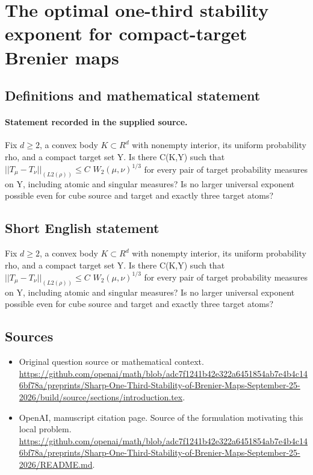 \documentclass[11pt]{article}
\begin{document}
\section*{The optimal one-third stability exponent for compact-target Brenier maps}\label{statement}
\subsection{Definitions and mathematical statement}
\paragraph{Statement recorded in the supplied source.}
Fix $d\geq 2$, a convex body $K\subset R^d$ with nonempty interior, its uniform probability rho, and a compact target set Y. Is there C(K,Y) such that $||T_\mu -T_\nu ||_(L2(\rho ))\leq C$ $W_2(\mu ,\nu )^{1/3}$ for every pair of target probability measures on Y, including atomic and singular measures? Is no larger universal exponent possible even for cube source and target and exactly three target atoms?
\subsection{Short English statement}
Fix $d\geq 2$, a convex body $K\subset R^d$ with nonempty interior, its uniform probability rho, and a compact target set Y. Is there C(K,Y) such that $||T_\mu -T_\nu ||_(L2(\rho ))\leq C$ $W_2(\mu ,\nu )^{1/3}$ for every pair of target probability measures on Y, including atomic and singular measures? Is no larger universal exponent possible even for cube source and target and exactly three target atoms?
\subsection{Sources}
\begin{itemize}
\item[S1] Original question source or mathematical context.
\url{https://github.com/openai/math/blob/adc7f1241b42e322a6451854ab7e4b4c146bf78a/preprints/Sharp-One-Third-Stability-of-Brenier-Maps-September-25-2026/build/source/sections/introduction.tex}.
\item[S2] OpenAI, manuscript citation page. Source of the formulation motivating this local problem.
\url{https://github.com/openai/math/blob/adc7f1241b42e322a6451854ab7e4b4c146bf78a/preprints/Sharp-One-Third-Stability-of-Brenier-Maps-September-25-2026/README.md}.
\end{itemize}
\end{document}
